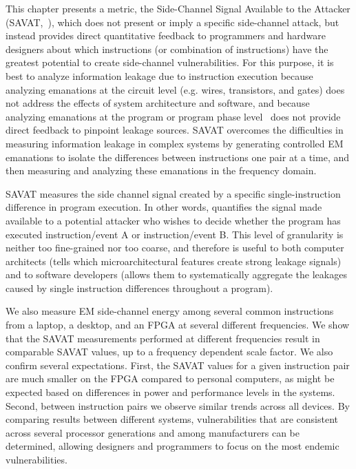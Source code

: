 This chapter presents a metric, the Side-Channel Signal Available to the Attacker (SAVAT,~\cite{CALLAN2014}), which does not present or imply a specific side-channel attack, but instead provides direct quantitative feedback to programmers and hardware designers about which instructions (or combination of instructions) have the greatest potential to create side-channel vulnerabilities. For this purpose, it is best to analyze information leakage due to instruction execution because analyzing emanations at the circuit level (e.g. wires, transistors, and gates) does not address the effects of system architecture and software, and because analyzing emanations at the program or program phase level~\cite{Demme_SVF_ISCA12,Demme_SVF_TopPicks12} does not provide direct feedback to pinpoint leakage sources. SAVAT overcomes the difficulties in measuring information leakage in complex systems by generating controlled EM emanations to isolate the differences between instructions one pair at a time, and then measuring and analyzing these emanations in the frequency domain.

SAVAT measures the side channel signal created by a specific single-instruction difference in program execution. In other words, \SAVAT quantifies the signal made available to a potential attacker who wishes to decide whether the program has executed instruction/event A or instruction/event B. This level of granularity is neither too fine-grained nor too coarse, and therefore is useful to both computer architects (\SAVAT tells which microarchitectural features create strong leakage signals) and to software developers (\SAVAT allows them to systematically aggregate the leakages caused by single instruction differences throughout a program).

We also measure EM side-channel energy among several common instructions from a laptop, a desktop, and an FPGA at several different frequencies. We show that the SAVAT measurements performed at different frequencies result in comparable SAVAT values, up to a frequency dependent scale factor. We also confirm several expectations. First, the SAVAT values for a given instruction pair are much smaller on the FPGA compared to personal computers, as might be expected based on differences in power and performance levels in the systems. Second, between instruction pairs we observe similar trends across all devices. By comparing results between different systems, vulnerabilities that are consistent across several processor generations and among manufacturers can be determined, allowing designers and programmers to focus on the most endemic vulnerabilities.

